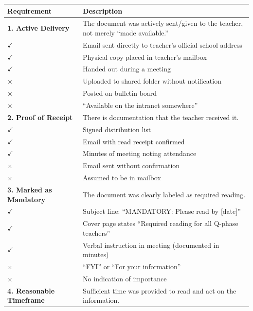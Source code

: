 \documentclass[11pt,a4paper]{article}
\begin{document}
\begin{center}
\begin{tabular}{>{\bfseries}p{4cm}p{9.5cm}}
\toprule
\textbf{Requirement} & \textbf{Description} \\
\midrule
1. Active Delivery &
    The document was actively sent/given to the teacher, not merely ``made available.'' \\[0.5em]

    \textcolor{successgreen}{$\checkmark$} & Email sent directly to teacher's official school address \\
    \textcolor{successgreen}{$\checkmark$} & Physical copy placed in teacher's mailbox \\
    \textcolor{successgreen}{$\checkmark$} & Handed out during a meeting \\[0.5em]
    \textcolor{warningred}{$\times$} & Uploaded to shared folder without notification \\
    \textcolor{warningred}{$\times$} & Posted on bulletin board \\
    \textcolor{warningred}{$\times$} & ``Available on the intranet somewhere'' \\
\midrule
2. Proof of Receipt &
    There is documentation that the teacher received it. \\[0.5em]

    \textcolor{successgreen}{$\checkmark$} & Signed distribution list \\
    \textcolor{successgreen}{$\checkmark$} & Email with read receipt confirmed \\
    \textcolor{successgreen}{$\checkmark$} & Minutes of meeting noting attendance \\[0.5em]
    \textcolor{warningred}{$\times$} & Email sent without confirmation \\
    \textcolor{warningred}{$\times$} & Assumed to be in mailbox \\
\midrule
3. Marked as Mandatory &
    The document was clearly labeled as required reading. \\[0.5em]

    \textcolor{successgreen}{$\checkmark$} & Subject line: ``MANDATORY: Please read by [date]'' \\
    \textcolor{successgreen}{$\checkmark$} & Cover page states ``Required reading for all Q-phase teachers'' \\
    \textcolor{successgreen}{$\checkmark$} & Verbal instruction in meeting (documented in minutes) \\[0.5em]
    \textcolor{warningred}{$\times$} & ``FYI'' or ``For your information'' \\
    \textcolor{warningred}{$\times$} & No indication of importance \\
\midrule
4. Reasonable Timeframe &
    Sufficient time was provided to read and act on the information. \\[0.5em]


\end{tabular}
\end{center}
\end{document}
